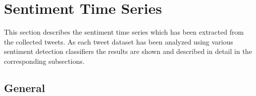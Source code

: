 

\section{Sentiment Time Series}
\label{s:analysis-sentiments}

This section describes the sentiment time series which has been extracted from the collected tweets.
As each tweet dataset has been analyzed using various sentiment detection classifiers the results are shown and described in detail in the corresponding subsections.

\subsection{General}
\label{ss:analysis-sentiments-general}

